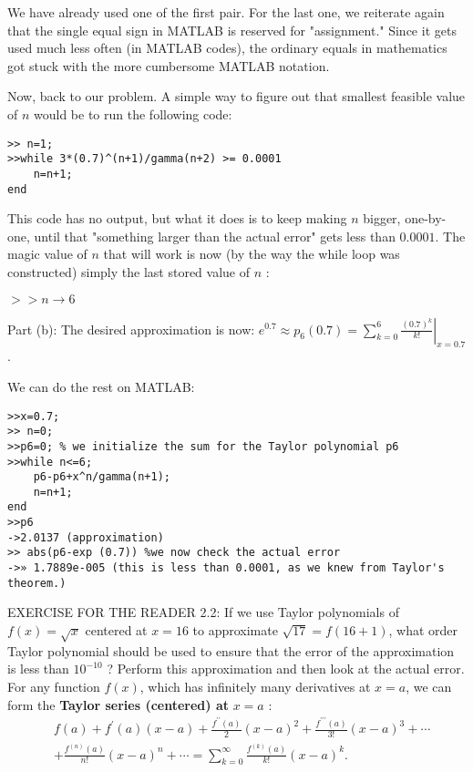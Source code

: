 \documentclass[../main.tex]{subfiles}
\begin{document}
We have already used one of the first pair. For the last one, we reiterate again that the single equal sign in MATLAB is reserved for "assignment." Since it gets used much less often (in MATLAB codes), the ordinary equals in mathematics got stuck with the more cumbersome MATLAB notation.

Now, back to our problem. A simple way to figure out that smallest feasible value of $n$ would be to run the following code:


\begin{verbatim}
>> n=1;
>>while 3*(0.7)^(n+1)/gamma(n+2) >= 0.0001
	n=n+1;
end
\end{verbatim}

This code has no output, but what it does is to keep making $n$ bigger, one-by-one, until that "something larger than the actual error" gets less than $0.0001$. The magic value of $n$ that will work is now (by the way the while loop was constructed) simply the last stored value of $n$ :

$>>n \rightarrow 6$

Part (b): The desired approximation is now: $e^{0.7} \approx p_{6}(0.7)=\left.\sum_{k=0}^{6} \frac{(0.7)^{k}}{k !}\right|_{x=0.7}$.

We can do the rest on MATLAB:

\begin{verbatim}
>>x=0.7;
>> n=0;
>>p6=0; % we initialize the sum for the Taylor polynomial p6
>>while n<=6;
	p6-p6+x^n/gamma(n+1); 
	n=n+1;
end
>>p6
->2.0137 (approximation)
>> abs(p6-exp (0.7)) %we now check the actual error
->» 1.7889e-005 (this is less than 0.0001, as we knew from Taylor's theorem.)
\end{verbatim}

EXERCISE FOR THE READER 2.2: If we use Taylor polynomials of $f(x)=\sqrt{x}$ centered at $x=16$ to approximate $\sqrt{17}=f(16+1)$, what order Taylor polynomial should be used to ensure that the error of the approximation is less than $10^{-10}$ ? Perform this approximation and then look at the actual error. For any function $f(x)$, which has infinitely many derivatives at $x=a$, we can form the \textbf{Taylor series (centered) at} $x=a$ :
$$
\begin{aligned}
&f(a)+f^{\prime}(a)(x-a)+\frac{f^{\prime \prime}(a)}{2}(x-a)^{2}+\frac{f^{\prime \prime \prime}(a)}{3 !}(x-a)^{3}+\cdots \\
&+\frac{f^{(n)}(a)}{n !}(x-a)^{n}+\cdots=\sum_{k=0}^{\infty} \frac{f^{(k)}(a)}{k !}(x-a)^{k} .
\end{aligned}
$$
\end{document}
